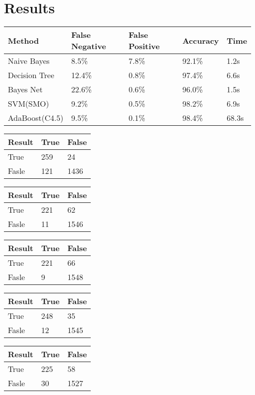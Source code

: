 \section{Results}
\begin{tabular}{|l|l l l l|}
\hline
Method & False Negative & False Positive & Accuracy & Time \\
\hline
Naive Bayes & 8.5\% & 7.8\% & 92.1\% & 1.2s \\
Decision Tree & 12.4\% & 0.8\% & 97.4\% & 6.6s \\
Bayes Net & 22.6\% & 0.6\% & 96.0\% & 1.5s \\
SVM(SMO) & 9.2\% & 0.5\% & 98.2\% & 6.9s \\
AdaBoost(C4.5) & 9.5\% & 0.1\% & 98.4\% & 68.3s \\
\hline
\end{tabular}
\begin{tabular}{|l|l l|}
\hline
Result & True & False \\
\hline
True & 259 & 24 \\
Fasle & 121 & 1436 \\
\hline
\end{tabular}
\begin{tabular}{|l|l l|}
\hline
Result & True & False \\
\hline
True & 221 & 62 \\
Fasle & 11 & 1546 \\
\hline
\end{tabular}
\begin{tabular}{|l|l l|}
\hline
Result & True & False \\
\hline
True & 221 & 66 \\
Fasle & 9 & 1548 \\
\hline
\end{tabular}
\begin{tabular}{|l|l l|}
\hline
Result & True & False \\
\hline
True & 248 & 35 \\
Fasle & 12 & 1545 \\
\hline
\end{tabular}
\begin{tabular}{|l|l l|}
\hline
Result & True & False \\
\hline
True & 225 & 58 \\
Fasle & 30 & 1527 \\
\hline
\end{tabular}
